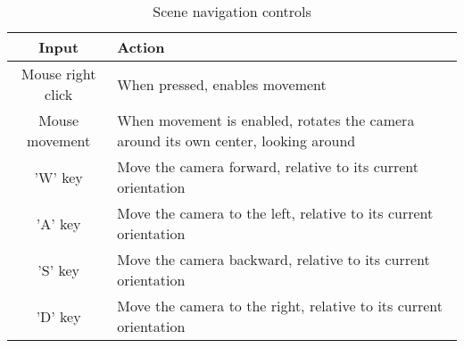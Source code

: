 \begin{table}[h]
    \centering
    \caption{Scene navigation controls}
    \begin{tabular}{|c|p{8cm}|}
        \hline
        Input & Action \\
        \hline \hline
        Mouse right click & When pressed, enables movement \\ \hline
        Mouse movement & When movement is enabled, rotates the camera around its own center, looking around \\ \hline
        'W' key & Move the camera forward, relative to its current orientation \\ \hline
        'A' key & Move the camera to the left, relative to its current orientation \\ \hline
        'S' key & Move the camera backward, relative to its current orientation \\ \hline
        'D' key & Move the camera to the right, relative to its current orientation \\
        \hline
    \end{tabular}
    \label{tab:my_label}
\end{table}
